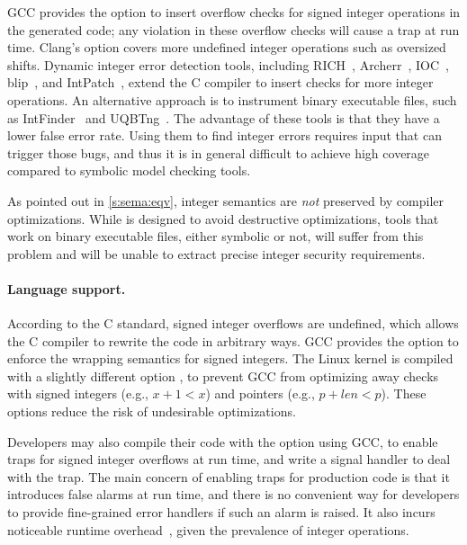 GCC provides the option  to insert overflow checks for
signed integer operations in the generated code; any violation in
these overflow checks will cause a trap at run time.
%
Clang's  option covers more undefined
integer operations such as oversized shifts.
%
Dynamic integer error detection tools,
including
RICH~\cite{brumley:rich},
Archerr~\cite{archerr},
IOC~\cite{ioc},
blip~\cite{blip},
and
IntPatch~\cite{intpatch},
extend the C compiler to insert checks for more integer operations.
%
An alternative approach is to instrument binary executable files,
such as IntFinder~\cite{intfinder} and UQBTng~\cite{uqbtng}.
%
The advantage of these tools is that they have a lower false error rate.
Using them to find integer errors requires input that can trigger
those bugs, and thus it is in general difficult to achieve high
coverage compared to symbolic model checking tools.

As pointed out in \autoref{s:sema:eqv}, integer semantics
are \emph{not} preserved by compiler optimizations.
While \sys is designed to avoid destructive optimizations, tools that
work on binary executable files, either symbolic or not,
will suffer from this problem and will be unable to extract
precise integer security requirements.

\paragraph{Language support.}

According to the C standard, signed integer overflows are undefined,
which allows the C compiler to rewrite the code in arbitrary ways.
GCC provides the option  to enforce the wrapping semantics
for signed integers.  The Linux kernel is compiled with a slightly
different option , to prevent GCC from
optimizing away checks with signed integers (e.g., $x + 1 < x$) and
pointers (e.g., $p + \mathit{len} < p$).  These options reduce the
risk of undesirable optimizations.

Developers may also compile their code with the  option
using GCC, to enable traps for signed integer overflows at run time,
and write a signal handler to deal with the trap.
The main concern of enabling traps for production code
is that it introduces false alarms at run time, and there is no
convenient way for developers to provide fine-grained error handlers
if such an alarm is raised.  It also incurs noticeable runtime
overhead~\cite{ioc}, given the prevalence of integer operations.

